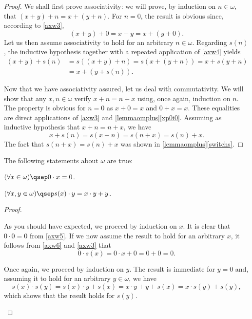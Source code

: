 \begin{proof}
We shall first prove associativity: we will prove, by induction on $n\in \omega$, that $(x+y)+n = x + (y + n)$. For $n=0$, the result is obvious since, according to \ref{axw3},
\[ (x+y) + 0 = x+ y = x + (y + 0).\]
Let us then assume associativity to hold for an arbitrary $n\in \omega$. Regarding $s(n)$, the inductive hypothesis together with a repeated application of \ref{axw4} yields
\begin{align*}
(x+y) + s(n) &= s( (x+y) + n ) = s(x + (y + n)) = x + s(y+n) \\
&= x + (y+ s(n)).
\end{align*}

Now that we have associativity assured, let us deal with commutativity. We will show that any $x,n\in \omega$ verify $x+n = n+x$ using, once again, induction on $n$. The property is obvious for $n=0$ as $x + 0 = x$ and $0 + x = x$. These equalities are direct applications of \ref{axw3} and \ref{lemmaomplus}\ref{xp0i0}.
Assuming as inductive hypothesis that $x+n = n+x$, we have
\[ x+ s(n) = s(x+n) = s(n+x) = s(n) + x.\]
The fact that $s(n+x) = s(n) + x$ was shown in \ref{lemmaomplus}\ref{switchs}. 
\end{proof}

\begin{lemma}
The following statements about $\omega$ are true:
\begin{statements}
\item \label{lemmaw0x} $(\forall x \in \omega)\qsep 0 \cdot x = 0$.
\item \label{lemmawps} $(\forall x,y\in \omega)\qsep s(x) \cdot y = x \cdot y + y$.
\end{statements}
\label{lemmawprod}
\end{lemma}

\begin{proof}
\begin{parlist}
\item As you should have expected, we proceed by induction on $x$. It is clear that $0\cdot 0 = 0$ from \ref{axw5}. If we now assume the result to hold for an arbitrary $x$, it follows from \ref{axw6} and \ref{axw3} that
\[ 0 \cdot s(x) = 0\cdot x + 0 = 0 + 0 = 0.\]

\item Once again, we proceed by induction on $y$. The result is immediate for $y = 0$ and, assuming it to hold for an arbitrary $y\in \omega$, we have
\[ s(x) \cdot s(y) = s(x) \cdot y + s(x) = x\cdot y + y + s(x) = x \cdot s(y) + s(y),\]
which shows that the result holds for $s(y)$.
\end{parlist}
\end{proof}

